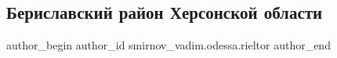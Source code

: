  
 
 
 
 
 
\subsection{Бериславский район Херсонской области}
\label{sec:05_04_2022.fb.smirnov_vadim.odessa.rieltor.1.berislav_rajon}
 
\ifcmt
 author_begin
   author_id smirnov_vadim.odessa.rieltor
 author_end
\fi
